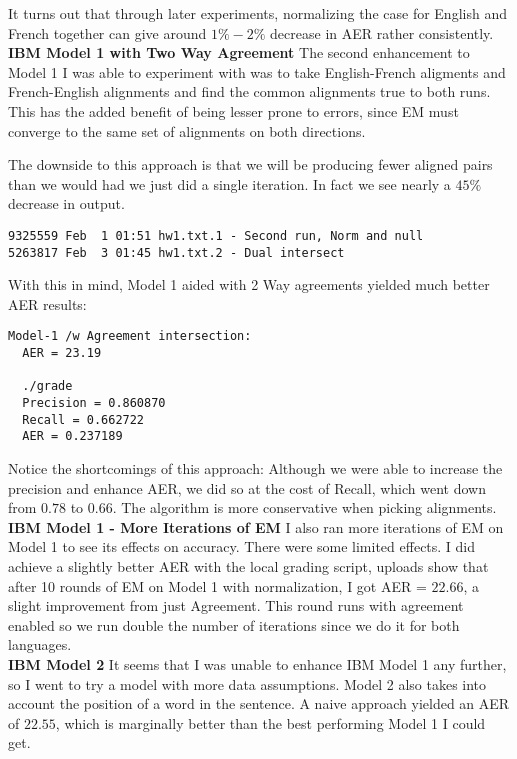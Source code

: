 \documentclass{article}
\begin{document}
It turns out that through later experiments, normalizing the case for English and French together can give around $1\% - 2 \%$ decrease in AER rather consistently.\\

{\bf IBM Model 1 with Two Way Agreement} 
The second enhancement to Model 1 I was able to experiment with was to take English-French aligments and French-English alignments and find the common alignments true to both runs. This has the added benefit of being lesser prone to errors, since EM must converge to the same set of alignments on both directions.

The downside to this approach is that we will be producing fewer aligned pairs than we would had we just did a single iteration. In fact we see nearly a $45\%$ decrease in output.

\begin{verbatim}
9325559 Feb  1 01:51 hw1.txt.1 - Second run, Norm and null
5263817 Feb  3 01:45 hw1.txt.2 - Dual intersect
\end{verbatim} 

With this in mind, Model 1 aided with 2 Way agreements yielded much better AER results:

\begin{verbatim}
Model-1 /w Agreement intersection:
  AER = 23.19
  
  ./grade
  Precision = 0.860870
  Recall = 0.662722
  AER = 0.237189
\end{verbatim}

Notice the shortcomings of this approach: Although we were able to increase the precision and enhance AER, we did so at the cost of Recall, which went down from $0.78$ to $0.66$. The algorithm is more conservative when picking alignments.\\

{\bf IBM Model 1 - More Iterations of EM}
I also ran more iterations of EM on Model 1 to see its effects on accuracy. There were some limited effects.  I did achieve a slightly better AER with the local grading script, uploads show that after 10 rounds of EM on Model 1 with normalization, I got AER = $22.66$, a slight improvement from just Agreement. This round runs with agreement enabled so we run double the number of iterations since we do it for both languages.\\

{\bf IBM Model 2} It seems that I was unable to enhance IBM Model 1 any further, so I went to try a model with more data assumptions. Model 2 also takes into account the position of a word in the sentence. A naive approach yielded an AER of $22.55$, which is marginally better than the best performing Model 1 I could get.
\end{document}
